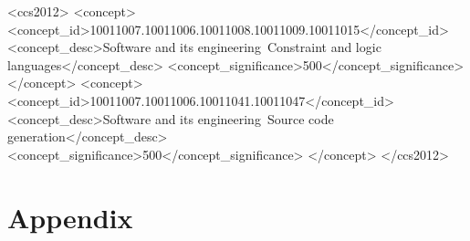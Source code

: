 \documentclass[acmlarge]{acmart}
\begin{document}
\begin{CCSXML}
<ccs2012>
<concept>
<concept_id>10011007.10011006.10011008.10011009.10011015</concept_id>
<concept_desc>Software and its engineering~Constraint and logic languages</concept_desc>
<concept_significance>500</concept_significance>
</concept>
<concept>
<concept_id>10011007.10011006.10011041.10011047</concept_id>
<concept_desc>Software and its engineering~Source code generation</concept_desc>
<concept_significance>500</concept_significance>
</concept>
</ccs2012>
\end{CCSXML}





\maketitle

\thispagestyle{empty}







%


\section{Appendix}
 
\end{document}
